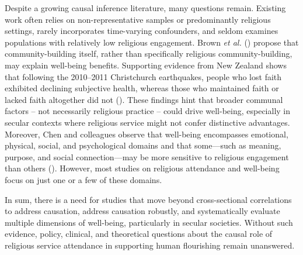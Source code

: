 \documentclass[
  single column]{article}
\begin{document}
Despite a growing causal inference literature, many questions remain.
Existing work often relies on non-representative samples or
predominantly religious settings, rarely incorporates time-varying
confounders, and seldom examines populations with relatively low
religious engagement. Brown \emph{et al.}
() propose that community-building
itself, rather than specifically religious community-building, may
explain well-being benefits. Supporting evidence from New Zealand shows
that following the 2010--2011 Christchurch earthquakes, people who lost
faith exhibited declining subjective health, whereas those who
maintained faith or lacked faith altogether did not
(). These findings
hint that broader communal factors -- not necessarily religious practice
-- could drive well-being, especially in secular contexts where
religious service might not confer distinctive advantages. Moreover,
Chen and colleagues observe that well-being encompasses emotional,
physical, social, and psychological domains and that some---such as
meaning, purpose, and social connection---may be more sensitive to
religious engagement than others
().
However, most studies on religious attendance and well-being focus on
just one or a few of these domains.

In sum, there is a need for studies that move beyond cross-sectional
correlations to address causation, address causation robustly, and
systematically evaluate multiple dimensions of well-being, particularly
in secular societies. Without such evidence, policy, clinical, and
theoretical questions about the causal role of religious service
attendance in supporting human flourishing remain unanswered.
\end{document}
